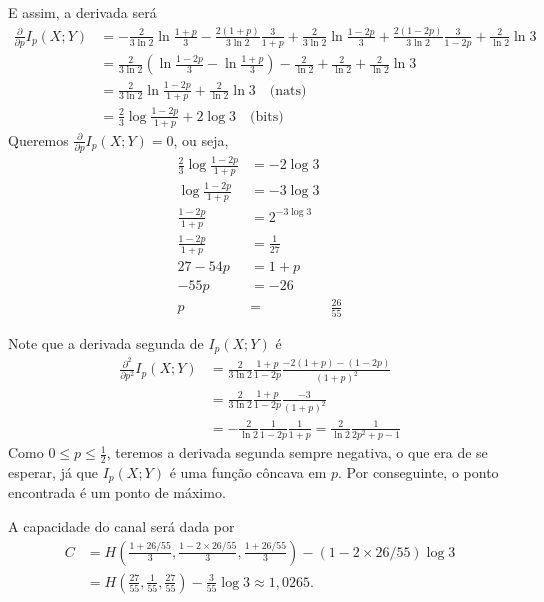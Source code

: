 \begin{questions}
\begin{solution}
E assim, a derivada será
\begin{align}
\frac{\partial }{\partial p} I_p(X;Y) &= - \frac{2}{3 \ln 2} \ln \frac{1+p}{3} - \frac{2(1+p)}{3 \ln 2} \frac{3}{1+p} 
                                                + \frac{2}{3\ln2} \ln \frac{1-2p}{3} + \frac{2(1-2p)}{3\ln2} \frac{3}{1-2p}
                                                + \frac{2}{\ln 2} \ln 3 \nonumber \\
                &= \frac{2}{3\ln2} \left( \ln \frac{1-2p}{3} - \ln \frac{1+p}{3} \right) - \frac{2}{\ln2} + \frac{2}{\ln2} + \frac{2}{\ln 2} \ln 3 \nonumber \\
                &= \frac{2}{3\ln2} \ln \frac{1-2p}{1+p} + \frac{2}{\ln2} \ln 3 \quad \text{(nats)} \nonumber \\
                &= \frac{2}{3} \log \frac{1-2p}{1+p} + 2 \log 3 \quad \text{(bits)}
\end{align}
Queremos $\frac{\partial }{\partial p} I_p(X;Y) = 0$, ou seja,
\begin{align}
\frac{2}{3} \log \frac{1-2p}{1+p} &= -  2 \log 3 \nonumber \\
\log \frac{1-2p}{1+p} &= - 3 \log 3 \nonumber \\
\frac{1-2p}{1+p} &= 2^{- 3 \log 3} \nonumber \\
\frac{1-2p}{1+p} &= \frac{1}{27} \nonumber \\
27 - 54 p &= 1 + p \nonumber \\
- 55 p &= - 26 \nonumber \\
p &=& \frac{26}{55}
\end{align}

Note que a derivada segunda de $I_p(X;Y)$ é 
\begin{align}
\frac{\partial^2 }{\partial p^2} I_p(X;Y) &=  \frac{2}{3\ln2} \frac{1+p}{1-2p} \frac{-2(1+p) - (1-2p)}{(1+p)^2} \nonumber \\
        &=  \frac{2}{3\ln2} \frac{1+p}{1-2p} \frac{-3}{(1+p)^2} \nonumber \\
        &= - \frac{2}{\ln2} \frac{1}{1-2p} \frac{1}{1+p} = \frac{2}{\ln2} \frac{1}{2p^2 + p - 1} 
\end{align}
Como $0 \leq p \leq \frac{1}{2}$, teremos a derivada segunda sempre negativa, o que era de se esperar, já que
$I_p(X;Y)$ é uma função côncava em $p$. Por conseguinte, o ponto encontrada é um ponto de máximo.

A capacidade do canal será dada por
\begin{align}
C &= H\left( \frac{1 + 26/55}{3}, \frac{1 - 2\times 26/55}{3}, \frac{1 + 26/55}{3} \right) - (1 - 2\times 26/55) \log 3 \\
  &= H\left( \frac{27}{55}, \frac{1}{55}, \frac{27}{55} \right) - \frac{3}{55} \log 3 \approx 1,0265 .
\end{align}


\end{solution}
\end{questions}
